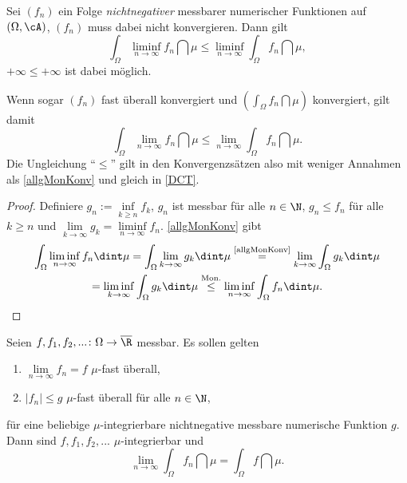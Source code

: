 \marginpar{\textcolor{red}{Vorlesung 12}}

\begin{satz}\label{fatou}
	Sei $(f_n)$ ein Folge \textit{nichtnegativer} messbarer numerischer Funktionen auf $(\Omega, \cA)$, $(f_n)$ muss dabei nicht konvergieren. Dann gilt \[ \int_{\Omega} \liminf\limits_{n \to \infty} f_n \dint \mu \leq \liminf\limits_{n \to \infty} \int_{\Omega} f_n \dint \mu,\]
	$+\infty\leq +\infty$ ist dabei m\"oglich.
	
\end{satz}
	Wenn sogar $(f_n)$ fast \"uberall konvergiert und $(\int_{\Omega} f_n \dint \mu)$ konvergiert, gilt damit
	\[ \int_{\Omega} \lim\limits_{n \to \infty} f_n \dint \mu \leq \lim\limits_{n \to \infty} \int_{\Omega} f_n \dint \mu. \]
	Die Ungleichung \enquote{$\leq$} gilt in den Konvergenzs\"atzen also mit weniger Annahmen als \ref{allgMonKonv} und gleich in \ref{DCT}.

\begin{proof}
	Definiere $g_n := \inf\limits_{k\geq n} f_k$, $g_n$ ist messbar für alle $n \in \N$, $g_n \leq f_n$ für alle $k \geq n$ und $ \lim\limits_{k \to \infty} g_k = \liminf\limits_{n \to \infty} f_n$.
	\ref{allgMonKonv} gibt 
	\begin{gather*}
		\int_{\Omega} \liminf\limits_{n \to \infty} f_n \dint \mu = \int_{\Omega} \lim\limits_{k \to \infty} g_k \dint \mu \overset{\text{\ref{allgMonKonv}}}{=} \lim\limits_{k \to \infty} \int_{\Omega} g_k \dint \mu\\ 
		= \liminf\limits_{k \to \infty} \int_{\Omega} g_k \dint \mu \overset{\text{Mon.}}{\leq} \liminf\limits_{n \to \infty} \int_{\Omega} f_n \dint \mu.
	\end{gather*} 
\end{proof}

\begin{satz}\label{DCT}
	Seien $f,f_1,f_2,...\colon \Omega \to \overline{\R}$ messbar. Es sollen gelten 
	\begin{enumerate}[label=(\alph*)]
		\item\label{DCA} $\lim\limits_{n \to \infty} f_n = f$ $\mu$-fast \"uberall,
		\item\label{DCB} $|f_n| \leq g$ $\mu$-fast überall f\"ur alle $n\in\N$,
	\end{enumerate}
	für eine beliebige $\mu$-integrierbare nichtnegative messbare numerische Funktion $g$. Dann sind $f,f_1,f_2,...$ $\mu$-integrierbar und \[ \lim\limits_{n \to \infty} \int_{\Omega} f_n \dint \mu = \int_{\Omega} f \dint \mu. \]
\end{satz}


